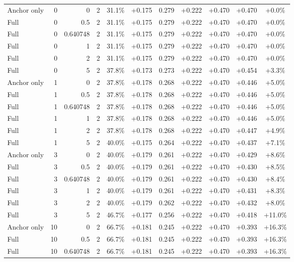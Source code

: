 \begin{table}[htbp]
\begin{tabular}{lrrrccccccc}
Anchor only & 0 & 0 & 2 & 31.1\% & +0.175 & 0.279 & +0.222 & +0.470 & +0.470 & +0.0\% \\
Full & 0 & 0.5 & 2 & 31.1\% & +0.175 & 0.279 & +0.222 & +0.470 & +0.470 & +0.0\% \\
Full & 0 & 0.640748 & 2 & 31.1\% & +0.175 & 0.279 & +0.222 & +0.470 & +0.470 & +0.0\% \\
Full & 0 & 1 & 2 & 31.1\% & +0.175 & 0.279 & +0.222 & +0.470 & +0.470 & +0.0\% \\
Full & 0 & 2 & 2 & 31.1\% & +0.175 & 0.279 & +0.222 & +0.470 & +0.470 & +0.0\% \\
Full & 0 & 5 & 2 & 37.8\% & +0.173 & 0.273 & +0.222 & +0.470 & +0.454 & +3.3\% \\
Anchor only & 1 & 0 & 2 & 37.8\% & +0.178 & 0.268 & +0.222 & +0.470 & +0.446 & +5.0\% \\
Full & 1 & 0.5 & 2 & 37.8\% & +0.178 & 0.268 & +0.222 & +0.470 & +0.446 & +5.0\% \\
Full & 1 & 0.640748 & 2 & 37.8\% & +0.178 & 0.268 & +0.222 & +0.470 & +0.446 & +5.0\% \\
Full & 1 & 1 & 2 & 37.8\% & +0.178 & 0.268 & +0.222 & +0.470 & +0.446 & +5.0\% \\
Full & 1 & 2 & 2 & 37.8\% & +0.178 & 0.268 & +0.222 & +0.470 & +0.447 & +4.9\% \\
Full & 1 & 5 & 2 & 40.0\% & +0.175 & 0.264 & +0.222 & +0.470 & +0.437 & +7.1\% \\
Anchor only & 3 & 0 & 2 & 40.0\% & +0.179 & 0.261 & +0.222 & +0.470 & +0.429 & +8.6\% \\
Full & 3 & 0.5 & 2 & 40.0\% & +0.179 & 0.261 & +0.222 & +0.470 & +0.430 & +8.5\% \\
Full & 3 & 0.640748 & 2 & 40.0\% & +0.179 & 0.261 & +0.222 & +0.470 & +0.430 & +8.4\% \\
Full & 3 & 1 & 2 & 40.0\% & +0.179 & 0.261 & +0.222 & +0.470 & +0.431 & +8.3\% \\
Full & 3 & 2 & 2 & 40.0\% & +0.179 & 0.262 & +0.222 & +0.470 & +0.432 & +8.0\% \\
Full & 3 & 5 & 2 & 46.7\% & +0.177 & 0.256 & +0.222 & +0.470 & +0.418 & +11.0\% \\
Anchor only & 10 & 0 & 2 & 66.7\% & +0.181 & 0.245 & +0.222 & +0.470 & +0.393 & +16.3\% \\
Full & 10 & 0.5 & 2 & 66.7\% & +0.181 & 0.245 & +0.222 & +0.470 & +0.393 & +16.3\% \\
Full & 10 & 0.640748 & 2 & 66.7\% & +0.181 & 0.245 & +0.222 & +0.470 & +0.393 & +16.3\% \\

\end{tabular}
\end{table}
